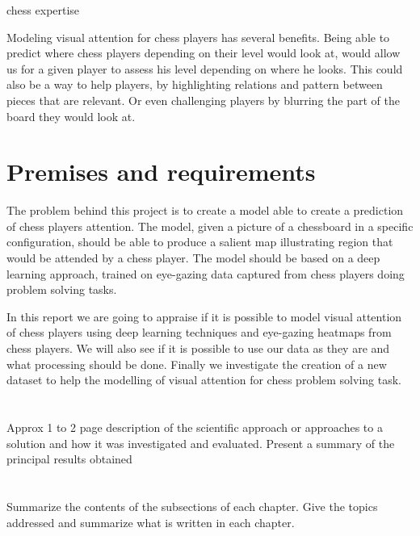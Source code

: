 chess expertise

Modeling visual attention for chess players has several benefits. Being able to predict where chess players depending on their level would look at, would allow us for a given player to assess his level depending on where he looks. This could also be a way to help players, by highlighting relations and pattern between pieces that are relevant. Or even challenging players by blurring the part of the board they would look at.





\section{Premises and requirements}

The problem behind this project is to create a model able to create a prediction of chess players attention. The model, given a picture of a chessboard in a specific configuration, should be able to produce a salient map illustrating region that would be attended by a chess player. The model should be based on a deep learning approach, trained on eye-gazing data captured from chess players doing problem solving tasks.

In this report we are going to appraise if it is possible to model visual attention of chess players using deep learning techniques and eye-gazing heatmaps from chess players. We will also see if it is possible to use our data as they are and what processing should be done. Finally we investigate the creation of a new dataset to help the modelling of visual attention for chess problem solving task.




\section{}
 
Approx  1 to 2  page description of the scientific approach or approaches to a solution and how it was   investigated and evaluated.  Present a summary of the principal results obtained

\section{}
Summarize the contents of the subsections of each chapter. Give the topics addressed and summarize what is written in each chapter. 